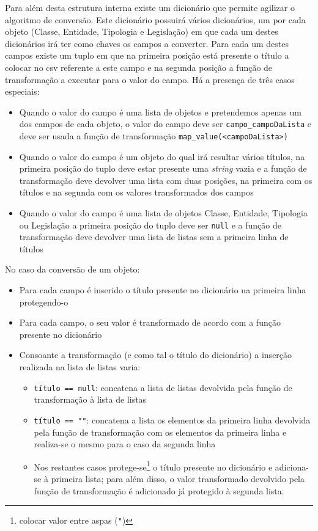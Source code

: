 Para além desta estrutura interna existe um dicionário que permite agilizar o algoritmo de conversão. Este dicionário possuirá vários dicionários, um por cada objeto (Classe, Entidade, Tipologia e Legislação) em que cada um destes dicionários irá ter como chaves os campos a converter. Para cada um destes campos existe um tuplo em que na primeira posição está presente o título a colocar no \acrshort{csv} referente a este campo e na segunda posição a função de transformação a executar para o valor do campo. Há a presença de três casos especiais:
\begin{itemize}
    \item Quando o valor do campo é uma lista de objetos e pretendemos apenas um dos campos de cada objeto, o valor do campo deve ser \verb|campo_campoDaLista| e deve ser usada a função de transformação \verb|map_value(<campoDaLista>)|
    \item Quando o valor do campo é um objeto do qual irá resultar vários títulos, na primeira posição do tuplo deve estar presente uma \textit{string} vazia e a função de transformação deve devolver uma lista com duas posições, na primeira com os títulos e na segunda com os valores transformados dos campos
    \item Quando o valor do campo é uma lista de objetos Classe, Entidade, Tipologia ou Legislação a primeira posição do tuplo deve ser \texttt{null} e a função de transformação deve devolver uma lista de listas sem a primeira linha de títulos
\end{itemize}
No caso da conversão de um objeto:
\begin{itemize}
    \item Para cada campo é inserido o título presente no dicionário na primeira linha protegendo-o  
    \item Para cada campo, o seu valor é transformado de acordo com a função presente no dicionário
    \item Consoante a transformação (e como tal o título do dicionário) a inserção realizada na lista de listas varia:
    \begin{itemize}
        \item \verb|título == null|: concatena a lista de listas devolvida pela função de transformação à lista de listas
        \item \verb|título == ""|: concatena a lista os elementos da primeira linha devolvida pela função de transformação com os elementos da primeira linha e realiza-se o mesmo para o caso da segunda linha
        \item Nos restantes casos protege-se\footnote{colocar valor entre aspas (\texttt{"})} o título presente no dicionário e adiciona-se à primeira lista; para além disso, o valor transformado devolvido pela função de transformação é adicionado já protegido à segunda lista.
    \end{itemize}
\end{itemize}

